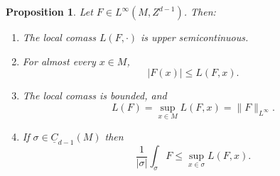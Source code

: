 \documentclass[reqno,11pt]{amsart}
\newcommand{\Chain}{\underline C}
\newtheorem{proposition}[theorem]{Proposition}
\theoremstyle{definition}
\numberwithin{equation}{section}
\begin{document}
\begin{proposition}\label{crandall}
Let $F \in L^\infty(M, Z^{d - 1})$. Then:
\begin{enumerate}
\item The local comass $L(F, \cdot)$ is upper semicontinuous. \label{crandall usc}
\item For almost every $x \in M$,
$$|F(x)| \leq L(F, x).$$
\label{crandall LDT}
\item The local comass is bounded, and \label{crandall linfinity}
$$L(F) = \sup_{x \in M} L(F, x) = \|F\|_{L^\infty}.$$
\item If $\sigma \in \Chain_{d - 1}(M)$ then \label{crandall best curl is ABC}
$$\frac{1}{|\sigma|} \int_\sigma F \leq \sup_{x \in \sigma} L(F, x).$$
\end{enumerate}
\end{proposition}
\end{document}
